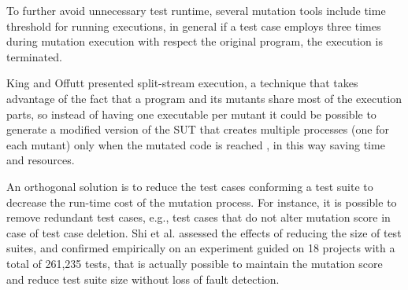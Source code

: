 To further avoid unnecessary test runtime, several mutation tools include time threshold for running executions, in general if a test case employs three times during mutation execution with respect the original program, the execution is terminated.

King and Offutt \cite{king1991fortran} presented split-stream execution, a technique that takes advantage of the fact that a program and its mutants share most of the execution parts, so instead of having one executable per mutant it could be possible to generate a modified version of the SUT that creates multiple processes (one for each mutant) only when the mutated code is reached \cite{tokumoto2016muvm}, in this way saving time and resources. 


An orthogonal solution is to reduce the test cases conforming a test suite to decrease the run-time cost of the mutation process. For instance, it is possible to remove redundant test cases, e.g., test cases that do not alter mutation score in case of test case deletion. Shi et al. \cite{shi2014balancing} assessed the effects of reducing the size of test suites, and confirmed empirically on an experiment guided on 18 projects with a total of 261,235 tests, that is actually possible to maintain the mutation score and reduce test suite size without loss of fault detection.

